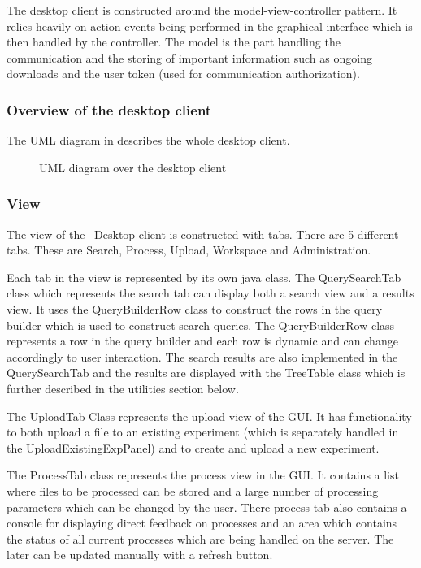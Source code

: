 The desktop client is constructed around the model-view-controller pattern. It relies heavily on action events being performed in the graphical interface which is then handled by the controller. The model is the part handling the communication and the storing of important information such as ongoing downloads and the user token (used for communication authorization).

\subsubsection{Overview of the desktop client}
The UML diagram in  describes the whole desktop client.
\begin{figure}[htb!]
	\caption{UML diagram over the desktop client}
	\label{fig:des_uml-overview}
\end{figure}


\subsubsection{View}
The view of the \appName\ Desktop client is constructed with tabs. There are 5 different tabs. These are Search, Process, Upload, Workspace and Administration.

Each tab in the view is represented by its own java class. The QuerySearchTab class which represents the search tab can display both a search view and a results view. It uses the QueryBuilderRow class to construct the rows in the query builder which is used to construct search queries. The QueryBuilderRow class represents a row in the query builder and each row is dynamic and can change accordingly to user interaction. The search results are also implemented in the QuerySearchTab and the results are displayed with the TreeTable class which is further described in the utilities section below.

The UploadTab Class represents the upload view of the GUI. It has functionality to both upload a file to an existing experiment (which is separately handled in the UploadExistingExpPanel) and to create and upload a new experiment.

The ProcessTab class represents the process view in the GUI. It contains a list where files to be processed can be stored and a large number of processing parameters which can be changed by the user. There process tab also contains a console for displaying direct feedback on processes and an area which contains the status of all current processes which are being handled on the server. The later can be updated manually with a refresh button.

